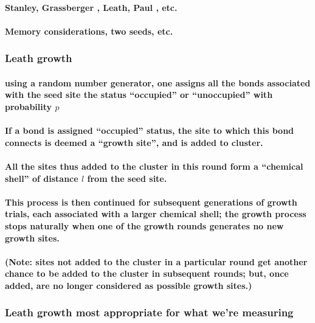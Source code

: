 \documentclass[pre,preprint]{revtex4-1}
\begin{document}
\paragraph{Stanley, Grassberger \cite{Gr99}, Leath, Paul \cite{Paul2001}, etc.}
\label{sec-2.2.1.1}
\paragraph{Memory considerations, two seeds, etc.}
\label{sec-2.2.1.2}
\subsubsection{Leath growth \cite{Leath}}
\label{sec-2.2.2}
\paragraph{using a random number generator, one assigns all the bonds associated with the seed site the status ``occupied'' or ``unoccupied'' with probability $p$}
\label{sec-2.2.2.1}
\paragraph{If a bond is assigned ``occupied'' status, the site to which this bond connects is deemed a ``growth site'', and is added to cluster.}
\label{sec-2.2.2.2}
\paragraph{All the sites thus added to the cluster in this round form a ``chemical shell'' of distance $l$ from the seed site.}
\label{sec-2.2.2.3}
\paragraph{This process is then continued for subsequent generations of growth trials, each associated with a larger chemical shell; the growth process stops naturally when one of the growth rounds generates no new growth sites.}
\label{sec-2.2.2.4}
\paragraph{(Note: sites not added to the cluster in a particular round get another chance to be added to the cluster in subsequent rounds; but, once added, are no longer considered as possible growth sites.)}
\label{sec-2.2.2.5}
\subsubsection{Leath growth most appropriate for what we're measuring}
\label{sec-2.2.3}
\end{document}
